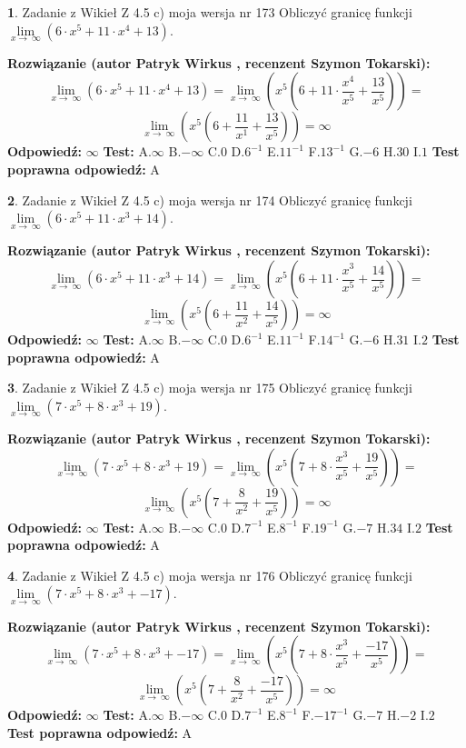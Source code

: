 \documentclass[12pt, a4paper]{article}
\theoremstyle{definition} %
\newtheorem{zad}{}
\newcommand{\zadStart}[1]{\begin{zad}#1\newline}
\newcommand{\zadStop}{\end{zad}}
\newcommand{\rozwStart}[2]{\noindent \textbf{Rozwiązanie (autor #1 , recenzent #2): }\newline}
\newcommand{\rozwStop}{\newline}
\newcommand{\odpStart}{\noindent \textbf{Odpowiedź:}\newline}
\newcommand{\odpStop}{\newline}
\newcommand{\testStart}{\noindent \textbf{Test:}\newline}
\newcommand{\testStop}{\newline}
\newcommand{\kluczStart}{\noindent \textbf{Test poprawna odpowiedź:}\newline}
\newcommand{\kluczStop}{\newline}
\begin{document}
\zadStart{Zadanie z Wikieł Z 4.5 c) moja wersja nr 173}
Obliczyć granicę funkcji  $\lim\limits_{x\to\ \infty}(6 \cdot x^{5}+11 \cdot x^{4}+13)$.
\zadStop
\rozwStart{Patryk Wirkus}{Szymon Tokarski}
$$\lim\limits_{x\to\ \infty}(6 \cdot x^{5}+11 \cdot x^{4}+13) = \lim\limits_{x\to\ \infty}(x^{5}(6 +11 \cdot \frac{x^{4}}{x^{5}}+\frac{13}{x^{5}})) =$$ $$\lim\limits_{x\to\ \infty}(x^{5}(6 +\frac{11}{x^{1}}+\frac{13}{x^{5}})) =\infty$$
\rozwStop
\odpStart
$\infty$
\odpStop
\testStart
A.$\infty$ B.$-\infty$ C.$0$ D.$6^{-1}$ E.$11^{-1}$
F.$13^{-1}$ G.$-6$
H.$30$
I.$1$
\testStop
\kluczStart
A
\kluczStop



\zadStart{Zadanie z Wikieł Z 4.5 c) moja wersja nr 174}
Obliczyć granicę funkcji  $\lim\limits_{x\to\ \infty}(6 \cdot x^{5}+11 \cdot x^{3}+14)$.
\zadStop
\rozwStart{Patryk Wirkus}{Szymon Tokarski}
$$\lim\limits_{x\to\ \infty}(6 \cdot x^{5}+11 \cdot x^{3}+14) = \lim\limits_{x\to\ \infty}(x^{5}(6 +11 \cdot \frac{x^{3}}{x^{5}}+\frac{14}{x^{5}})) =$$ $$\lim\limits_{x\to\ \infty}(x^{5}(6 +\frac{11}{x^{2}}+\frac{14}{x^{5}})) =\infty$$
\rozwStop
\odpStart
$\infty$
\odpStop
\testStart
A.$\infty$ B.$-\infty$ C.$0$ D.$6^{-1}$ E.$11^{-1}$
F.$14^{-1}$ G.$-6$
H.$31$
I.$2$
\testStop
\kluczStart
A
\kluczStop



\zadStart{Zadanie z Wikieł Z 4.5 c) moja wersja nr 175}
Obliczyć granicę funkcji  $\lim\limits_{x\to\ \infty}(7 \cdot x^{5}+8 \cdot x^{3}+19)$.
\zadStop
\rozwStart{Patryk Wirkus}{Szymon Tokarski}
$$\lim\limits_{x\to\ \infty}(7 \cdot x^{5}+8 \cdot x^{3}+19) = \lim\limits_{x\to\ \infty}(x^{5}(7 +8 \cdot \frac{x^{3}}{x^{5}}+\frac{19}{x^{5}})) =$$ $$\lim\limits_{x\to\ \infty}(x^{5}(7 +\frac{8}{x^{2}}+\frac{19}{x^{5}})) =\infty$$
\rozwStop
\odpStart
$\infty$
\odpStop
\testStart
A.$\infty$ B.$-\infty$ C.$0$ D.$7^{-1}$ E.$8^{-1}$
F.$19^{-1}$ G.$-7$
H.$34$
I.$2$
\testStop
\kluczStart
A
\kluczStop



\zadStart{Zadanie z Wikieł Z 4.5 c) moja wersja nr 176}
Obliczyć granicę funkcji  $\lim\limits_{x\to\ \infty}(7 \cdot x^{5}+8 \cdot x^{3}+-17)$.
\zadStop
\rozwStart{Patryk Wirkus}{Szymon Tokarski}
$$\lim\limits_{x\to\ \infty}(7 \cdot x^{5}+8 \cdot x^{3}+-17) = \lim\limits_{x\to\ \infty}(x^{5}(7 +8 \cdot \frac{x^{3}}{x^{5}}+\frac{-17}{x^{5}})) =$$ $$\lim\limits_{x\to\ \infty}(x^{5}(7 +\frac{8}{x^{2}}+\frac{-17}{x^{5}})) =\infty$$
\rozwStop
\odpStart
$\infty$
\odpStop
\testStart
A.$\infty$ B.$-\infty$ C.$0$ D.$7^{-1}$ E.$8^{-1}$
F.$-17^{-1}$ G.$-7$
H.$-2$
I.$2$
\testStop
\kluczStart
A
\kluczStop
\end{document}
